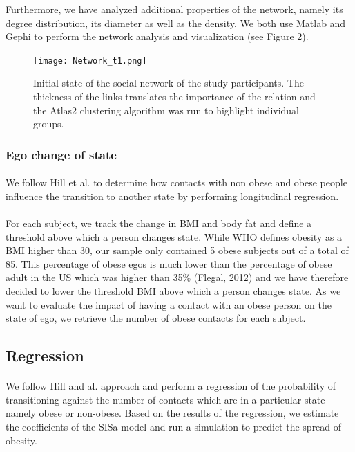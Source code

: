 \documentclass[11pt]{article}
\begin{document}
Furthermore, we have analyzed additional properties of the network, namely its degree distribution, its diameter as well as the density. We both use Matlab and Gephi to perform the network analysis and visualization (see Figure 2).

\begin{figure}[!h]
\center
   \texttt{[image: Network\_t1.png]}
   \caption{\label{4} Initial state of the social network of the study participants. The thickness of the links translates the importance of the relation and the Atlas2 clustering algorithm was run to highlight individual groups.}
\end{figure}

\subsubsection{Ego change of state}
\paragraph{}
We follow Hill et al. to determine how contacts with non obese and obese people influence the transition to another state by performing longitudinal regression. 
\paragraph{}
For each subject, we track the change in BMI and body fat and define a threshold above which a person changes state. While WHO defines obesity as a BMI higher than 30, our sample only contained 5 obese subjects out of a total of 85. This percentage of obese egos is much lower than the percentage of obese adult in the US which was higher than 35\% (Flegal, 2012) and we have therefore decided to lower the threshold BMI above which a person changes state. As we want to evaluate the impact of having a contact with an obese person  on the state of ego, we retrieve the number of obese contacts for each subject.

\subsection{Regression}
\paragraph{}
We follow Hill and al. approach and perform a regression of the probability of transitioning against the number of contacts which are in a particular state namely obese or non-obese. Based on the results of the regression, we estimate the coefficients of the SISa model and run a simulation to predict the spread of obesity.
\end{document}
